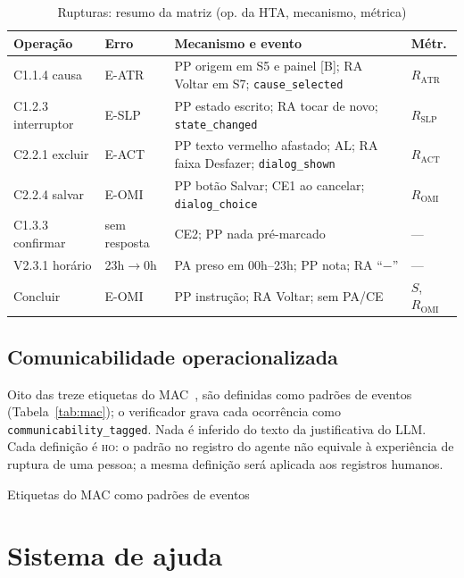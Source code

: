 \documentclass[conference]{IEEEtran}
\newcommand{\stHO}{\textsc{ho}}
\newcommand{\ev}[1]{\texttt{#1}}
\begin{document}
\begin{table}[!t]
\caption{Rupturas: resumo da matriz (op. da HTA, mecanismo, métrica)}
\label{tab:rup}
\centering
\scriptsize
\setlength{\tabcolsep}{2.5pt}
\begin{tabularx}{\columnwidth}{@{}P{1.6cm}P{1.15cm}YP{0.75cm}@{}}
\toprule
\textbf{Operação} & \textbf{Erro} & \textbf{Mecanismo e evento} & \textbf{Métr.} \\
\midrule
C1.1.4 causa & E-ATR & PP origem em S5 e painel [B]; RA Voltar em S7; \ev{cause\_selected} & $R_{\mathrm{ATR}}$ \\
C1.2.3 interruptor & E-SLP & PP estado escrito; RA tocar de novo; \ev{state\_changed} & $R_{\mathrm{SLP}}$ \\
C2.2.1 excluir & E-ACT & PP texto vermelho afastado; AL; RA faixa Desfazer; \ev{dialog\_shown} & $R_{\mathrm{ACT}}$ \\
C2.2.4 salvar & E-OMI & PP botão Salvar; CE1 ao cancelar; \ev{dialog\_choice} & $R_{\mathrm{OMI}}$ \\
C1.3.3 confirmar & sem resposta & CE2; PP nada pré-marcado & --- \\
V2.3.1 horário & 23h$\rightarrow$0h & PA preso em 00h--23h; PP nota; RA ``$-$'' & --- \\
Concluir & E-OMI & PP instrução; RA Voltar; sem PA/CE & $S$, $R_{\mathrm{OMI}}$ \\
\bottomrule
\end{tabularx}
\end{table}

\subsection{Comunicabilidade operacionalizada}
Oito das treze etiquetas do MAC~\cite{prates2000}, \cite{barbosa2010} são definidas como padrões de eventos (Tabela~\ref{tab:mac}); o verificador grava cada ocorrência como \ev{communicability\_tagged}. Nada é inferido do texto da justificativa do LLM. Cada definição é \stHO: o padrão no registro do agente não equivale à experiência de ruptura de uma pessoa; a mesma definição será aplicada aos registros humanos.

\begin{table}[!t]
\caption{Etiquetas do MAC como padrões de eventos}
\label{tab:mac}
\centering

\end{table}

\section{Sistema de ajuda}\label{sec:ajuda}
\end{document}
